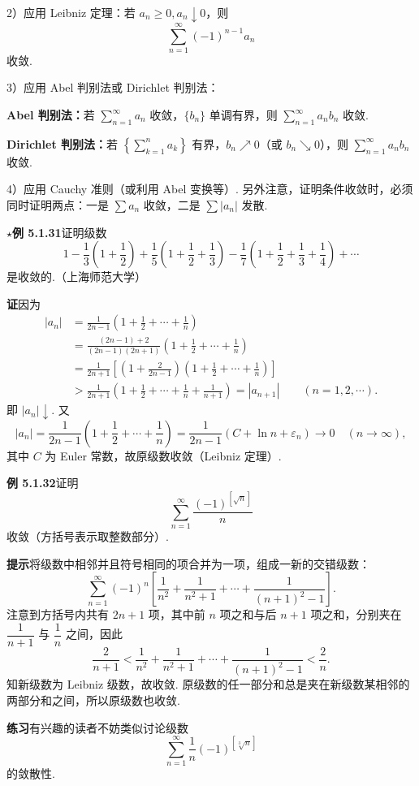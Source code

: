 \documentclass[UTF8, 12pt, fontset=fandol, oneside]{ctexart}
\begin{document}
2）应用 Leibniz 定理：若 $a_n\ge0,a_n\downarrow0$，则
\[
  \sum_{n=1}^\infty(-1)^{n-1}a_n
\]
收敛.

3）应用 Abel 判别法或 Dirichlet 判别法：

\noindent\textbf{Abel 判别法：}若 $\displaystyle\sum_{n=1}^\infty a_n$ 收敛，$\{b_n\}$ 单调有界，则 $\displaystyle\sum_{n=1}^\infty a_nb_n$ 收敛.

\noindent\textbf{Dirichlet 判别法：}若 $\left\{\displaystyle\sum_{k=1}^n a_k\right\}$ 有界，$b_n\nearrow0$（或 $b_n\searrow0$），则 $\displaystyle\sum_{n=1}^\infty a_nb_n$ 收敛.

4）应用 Cauchy 准则（或利用 Abel 变换等）. 另外注意，证明条件收敛时，必须同时证明两点：一是 $\sum a_n$ 收敛，二是 $\sum |a_n|$ 发散.

\noindent\textbf{$\star$例 5.1.31}\quad 证明级数
\[
  1-\frac13\left(1+\frac12\right)
  +\frac15\left(1+\frac12+\frac13\right)
  -\frac17\left(1+\frac12+\frac13+\frac14\right)+\cdots
\]
是收敛的.（上海师范大学）

\noindent\textbf{证}\quad 因为
\[
\begin{aligned}
|a_n|
&=\frac1{2n-1}\left(1+\frac12+\cdots+\frac1n\right)\\
&=\frac{(2n-1)+2}{(2n-1)(2n+1)}
  \left(1+\frac12+\cdots+\frac1n\right)\\
&=\frac1{2n+1}\left[\left(1+\frac2{2n-1}\right)
  \left(1+\frac12+\cdots+\frac1n\right)\right]\\
&>\frac1{2n+1}\left(1+\frac12+\cdots+\frac1n+\frac1{n+1}\right)
=|a_{n+1}|\qquad(n=1,2,\cdots).
\end{aligned}
\]
即 $|a_n|\downarrow$. 又
\[
  |a_n|=\frac1{2n-1}\left(1+\frac12+\cdots+\frac1n\right)
  =\frac1{2n-1}(C+\ln n+\varepsilon_n)\to0\quad(n\to\infty),
\]
其中 $C$ 为 Euler 常数，故原级数收敛（Leibniz 定理）.

\noindent\textbf{例 5.1.32}\quad 证明
\[
  \sum_{n=1}^{\infty}\frac{(-1)^{[\sqrt n]}}n
\]
收敛（方括号表示取整数部分）.

\noindent\textbf{提示}\quad 将级数中相邻并且符号相同的项合并为一项，组成一新的交错级数：
\[
  \sum_{n=1}^{\infty}(-1)^n
  \left[\frac1{n^2}+\frac1{n^2+1}+\cdots+\frac1{(n+1)^2-1}\right].
\]
注意到方括号内共有 $2n+1$ 项，其中前 $n$ 项之和与后 $n+1$ 项之和，分别夹在 $\dfrac1{n+1}$ 与 $\dfrac1n$ 之间，因此
\[
  \frac2{n+1}<\frac1{n^2}+\frac1{n^2+1}
  +\cdots+\frac1{(n+1)^2-1}<\frac2n.
\]
知新级数为 Leibniz 级数，故收敛. 原级数的任一部分和总是夹在新级数某相邻的两部分和之间，所以原级数也收敛.

\noindent\textbf{练习}\quad 有兴趣的读者不妨类似讨论级数
\[
  \sum_{n=1}^{\infty}\frac1n(-1)^{[\sqrt[3]n]}
\]
的敛散性.
\end{document}
